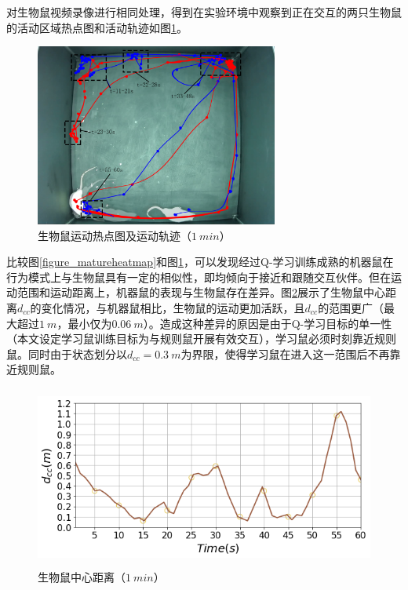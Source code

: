 对生物鼠视频录像进行相同处理，得到在实验环境中观察到正在交互的两只生物鼠的活动区域热点图和活动轨迹如图\ref{figure_livingheatmap}。
\begin{figure}[htbp]
  \vspace{13pt}
  \centering
  \includegraphics[height=6cm]{images/ch05/mature/livingheatmap.png}
  \caption{生物鼠运动热点图及运动轨迹（$1~min$）}\label{figure_livingheatmap}
\end{figure} 

比较图\ref{figure_matureheatmap}和图\ref{figure_livingheatmap}，可以发现经过Q-学习训练成熟的机器鼠在行为模式上与生物鼠具有一定的相似性，即均倾向于接近和跟随交互伙伴。但在运动范围和运动距离上，机器鼠的表现与生物鼠存在差异。图\ref{figure_livingdistance}展示了生物鼠中心距离$d_{cc}$的变化情况，与机器鼠相比，生物鼠的运动更加活跃，且$d_{cc}$的范围更广（最大超过$1~m$，最小仅为$0.06~m$）。造成这种差异的原因是由于Q-学习目标的单一性（本文设定学习鼠训练目标为与规则鼠开展有效交互），学习鼠必须时刻靠近规则鼠。同时由于状态划分以$d_{cc}=0.3~m$为界限，使得学习鼠在进入这一范围后不再靠近规则鼠。
\begin{figure}[htbp]
  \vspace{13pt}
  \centering
  \includegraphics[height=6cm]{images/ch05/mature/livingdistance.png}
  \caption{生物鼠中心距离（$1~min$）}\label{figure_livingdistance}
\end{figure}


